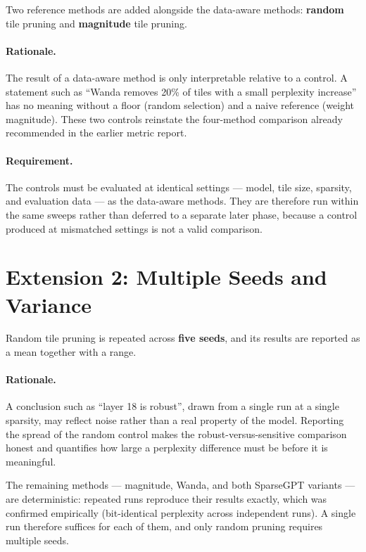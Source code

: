 \documentclass[11pt]{article}
\begin{document}
Two reference methods are added alongside the data-aware methods: \textbf{random} tile pruning and
\textbf{magnitude} tile pruning.

\paragraph{Rationale.} The result of a data-aware method is only interpretable relative to a control. A
statement such as ``Wanda removes 20\% of tiles with a small perplexity increase'' has no meaning without
a floor (random selection) and a naive reference (weight magnitude). These two controls reinstate the
four-method comparison already recommended in the earlier metric report.

\paragraph{Requirement.} The controls must be evaluated at identical settings --- model, tile size,
sparsity, and evaluation data --- as the data-aware methods. They are therefore run within the same sweeps
rather than deferred to a separate later phase, because a control produced at mismatched settings is not
a valid comparison.

\section{Extension 2: Multiple Seeds and Variance}
\label{sec:seeds}

Random tile pruning is repeated across \textbf{five seeds}, and its results are reported as a mean together
with a range.

\paragraph{Rationale.} A conclusion such as ``layer 18 is robust'', drawn from a single run at a single
sparsity, may reflect noise rather than a real property of the model. Reporting the spread of the random
control makes the robust-versus-sensitive comparison honest and quantifies how large a perplexity
difference must be before it is meaningful.

The remaining methods --- magnitude, Wanda, and both SparseGPT variants --- are deterministic: repeated
runs reproduce their results exactly, which was confirmed empirically (bit-identical perplexity across
independent runs). A single run therefore suffices for each of them, and only random pruning requires
multiple seeds.
\end{document}
